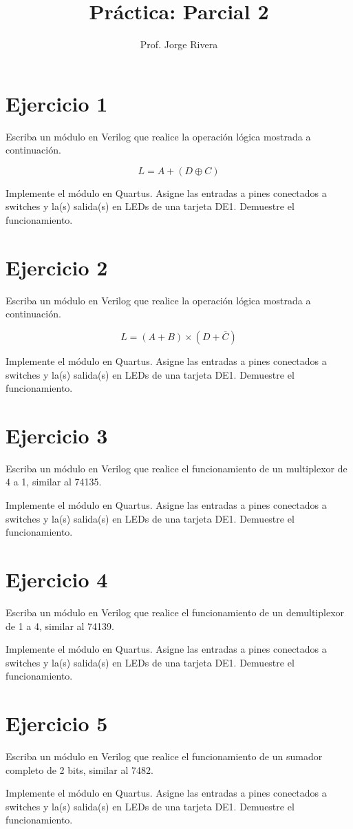 \documentclass[letterpaper,12pt]{IEEEtran}
\title{Práctica: Parcial 2}
\author{Prof. Jorge Rivera}
\begin{document}
\maketitle

\section*{Ejercicio 1}

Escriba un módulo en Verilog que realice la operación lógica mostrada a continuación.

\[ L = A + ( D \oplus C )  \]

Implemente el módulo en Quartus. Asigne las entradas a pines conectados a switches y la(s) salida(s) en LEDs de una tarjeta DE1. Demuestre el funcionamiento.

\section*{Ejercicio 2}

Escriba un módulo en Verilog que realice la operación lógica mostrada a continuación.

\[ L = ( A + B ) \times ( D + \overline{C} )  \]

Implemente el módulo en Quartus. Asigne las entradas a pines conectados a switches y la(s) salida(s) en LEDs de una tarjeta DE1. Demuestre el funcionamiento.

\newpage



\section*{Ejercicio 3}

Escriba un módulo en Verilog que realice el funcionamiento de un multiplexor de 4 a 1, similar al 74135.

Implemente el módulo en Quartus. Asigne las entradas a pines conectados a switches y la(s) salida(s) en LEDs de una tarjeta DE1. Demuestre el funcionamiento.

\section*{Ejercicio 4}

Escriba un módulo en Verilog que realice el funcionamiento de un demultiplexor de 1 a 4, similar al 74139.

Implemente el módulo en Quartus. Asigne las entradas a pines conectados a switches y la(s) salida(s) en LEDs de una tarjeta DE1. Demuestre el funcionamiento.

\section*{Ejercicio 5}

Escriba un módulo en Verilog que realice el funcionamiento de un sumador completo de 2 bits, similar al 7482.

Implemente el módulo en Quartus. Asigne las entradas a pines conectados a switches y la(s) salida(s) en LEDs de una tarjeta DE1. Demuestre el funcionamiento.
\end{document}
